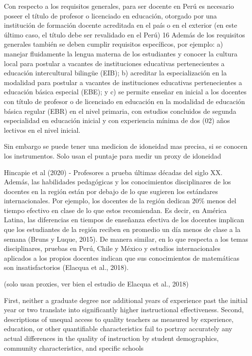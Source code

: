 Con respecto a los requisitos generales, para ser docente en Perú es necesario poseer el título de profesor o licenciado en educación, otorgado por una institución de formación docente acreditada en el país o en el exterior (en este último caso, el título debe ser revalidado en el Perú) 16 Además de los requisitos generales también se deben cumplir requisitos específicos, por ejemplo: a) manejar fluidamente la lengua materna de los estudiantes y conocer la cultura local para postular a vacantes de instituciones educativas pertenecientes a educación intercultural bilingüe (EIB); b) acreditar la especialización en la modalidad para postular a vacantes de instituciones educativas pertenecientes a educación básica especial (EBE); y c) se permite enseñar en inicial a los docentes con título de profesor o de licenciado en educación en la modalidad de educación básica regular (EBR) en el nivel primaria, con estudios concluidos de segunda especialidad en educación inicial y con experiencia mínima de dos (02) años lectivos en el nivel inicial.

Sin embargo se puede tener una medicion de idoneidad mas precisa, si se conocen los instrumentos. Solo usan el puntaje para medir un proxy de idoneidad


Hincapie et al (2020) - Profesores a prueba
últimas décadas del siglo XX. Además, las habilidades pedagógicas y los conocimientos disciplinares de los docentes en la región están por debajo de lo que sugieren los estándares internacionales. Por ejemplo, los docentes de la región dedican 20\% menos del tiempo efectivo en clase de lo que estos recomiendan. Es decir, en América Latina, las diferencias
en tiempos de enseñanza efectiva de los docentes implican que los estudiantes de la región reciben en promedio un día menos de clase a la semana (Bruns y Luque, 2015). De manera similar, en lo que respecta a los temas disciplinares, pruebas en Perú, Chile y México y estudios internacionales aplicados a los propios docentes indican que sus conocimientos de
matemáticas son insatisfactorios (Elacqua et al., 2018).

(solo usan proxies, ver bien el estudio de Elacqua et al., 2018)


First, neither a graduate degree nor additional years of experience past the initial year or two translate into significantly higher instructional effectiveness. Second, descriptions of unequal access to quality teachers as measured by experience, education, or other quantifiable characteristics fail to portray accurately any actual differences in the quality of instruction by student demographics, community characteristics, and specific schools \citep{Hanushek_et_al_2012}


